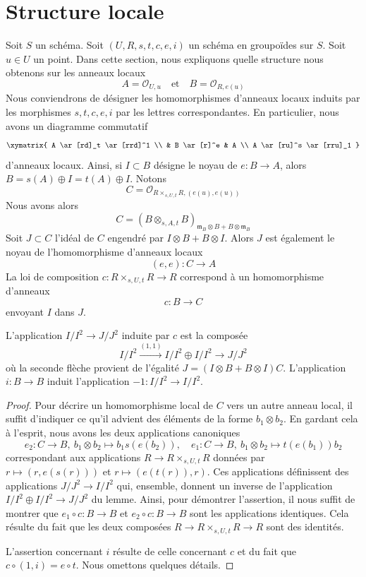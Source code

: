 \section{Structure locale}
\label{section-local}

\noindent
Soit $S$ un schéma.
Soit $(U, R, s, t, c, e, i)$ un schéma en groupoïdes sur $S$.
Soit $u \in U$ un point. Dans cette section, nous expliquons quelle
structure nous obtenons sur les anneaux locaux
$$
A = \mathcal{O}_{U, u}
\quad\text{et}\quad
B = \mathcal{O}_{R, e(u)}
$$
Nous conviendrons de désigner les homomorphismes d'anneaux locaux
induits par les morphismes $s, t, c, e, i$ par les lettres correspondantes.
En particulier, nous avons un diagramme commutatif
$$
\xymatrix{
A \ar[rd]_t \ar[rrd]^1 \\
& B \ar[r]^e & A \\
A \ar[ru]^s \ar[rru]_1
}
$$
d'anneaux locaux. Ainsi, si $I \subset B$ désigne le noyau de $e : B \to A$,
alors $B = s(A) \oplus I = t(A) \oplus I$. Notons
$$
C = \mathcal{O}_{R \times_{s, U, t} R, (e(u), e(u))}
$$
Nous avons alors
$$
C = (B \otimes_{s, A, t} B)_{\mathfrak m_B \otimes B + B \otimes \mathfrak m_B}
$$
Soit $J \subset C$ l'idéal de $C$ engendré par $I \otimes B + B \otimes I$.
Alors $J$ est également le noyau de l'homomorphisme d'anneaux locaux
$$
(e, e) : C \longrightarrow A
$$
La loi de composition $c : R \times_{s, U, t} R \to R$ correspond à un
homomorphisme d'anneaux
$$
c : B \longrightarrow C
$$
envoyant $I$ dans $J$.

\begin{lemma}
\label{lemma-first-order-structure-c}
L'application $I/I^2 \to J/J^2$ induite par $c$ est la composée
$$
I/I^2 \xrightarrow{(1, 1)} I/I^2 \oplus I/I^2 \to J/J^2
$$
où la seconde flèche provient de l'égalité
$J = (I \otimes B + B \otimes I)C$.
L'application $i : B \to B$ induit l'application $-1 : I/I^2 \to I/I^2$.
\end{lemma}

\begin{proof}
Pour décrire un homomorphisme local de $C$ vers un autre anneau local,
il suffit d'indiquer ce qu'il advient des éléments de la forme
$b_1 \otimes b_2$. En gardant cela à l'esprit, nous avons les deux applications canoniques
$$
e_2 : C \to B,\ b_1 \otimes b_2 \mapsto b_1s(e(b_2)),\quad
e_1 : C \to B,\ b_1 \otimes b_2 \mapsto t(e(b_1))b_2
$$
correspondant aux applications
$R \to R \times_{s, U, t} R$ données par
$r \mapsto (r, e(s(r)))$ et $r \mapsto (e(t(r)), r)$.
Ces applications définissent des applications $J/J^2 \to I/I^2$ qui, ensemble,
donnent un inverse de l'application $I/I^2 \oplus I/I^2 \to J/J^2$
du lemme. Ainsi, pour démontrer l'assertion, il nous suffit de montrer
que $e_1 \circ c : B \to B$ et $e_2 \circ c : B \to B$
sont les applications identiques. Cela résulte du fait que les deux
composées $R \to R \times_{s, U, t} R \to R$ sont des identités.

\medskip\noindent
L'assertion concernant $i$ résulte de celle concernant $c$ et du
fait que $c \circ (1, i) = e \circ t$. Nous omettons quelques détails.
\end{proof}






